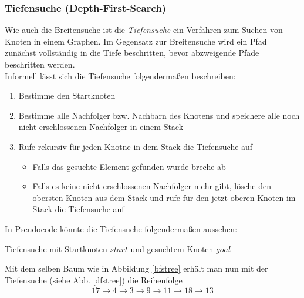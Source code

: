 \subsubsection{Tiefensuche (Depth-First-Search)}
Wie auch die Breitensuche ist die \emph{Tiefensuche} ein Verfahren zum Suchen von Knoten in einem Graphen. Im Gegensatz zur Breitensuche wird ein Pfad zunächst vollständig in die Tiefe beschritten, bevor abzweigende Pfade beschritten werden.\\
Informell lässt sich die Tiefensuche folgendermaßen beschreiben:
\begin{enumerate}
	\item Bestimme den Startknoten
	\item Bestimme alle Nachfolger bzw. Nachbarn des Knotens und speichere alle noch nicht erschlossenen Nachfolger in einem Stack
	\item Rufe rekursiv für jeden Knotne in dem Stack die Tiefensuche auf
	\begin{itemize}
		\item Falls das gesuchte Element gefunden wurde breche ab
		\item Falls es keine nicht erschlossenen Nachfolger mehr gibt, lösche den obersten Knoten aus dem Stack und rufe für den jetzt oberen Knoten im Stack die Tiefensuche auf
	\end{itemize}
\end{enumerate}

In Pseudocode könnte die Tiefensuche folgendermaßen aussehen:
\begin{algorithm}[H]
	\caption{Tiefensuche mit Startknoten $start$ und gesuchtem Knoten $goal$}
	\begin{algorithmic}
			\EndIf
			\EndWhile
		\EndProcedure
	\end{algorithmic}
\end{algorithm}

\begin{bsp}
	Mit dem selben Baum wie in Abbildung \ref{bfstree} erhält man nun mit der Tiefensuche (siehe Abb. \ref{dfstree}) die Reihenfolge
	\begin{gather*}
		17 \rightarrow 4 \rightarrow 3 \rightarrow 9 \rightarrow 11 \rightarrow 18 \rightarrow 13 
	\end{gather*}
\end{bsp}

